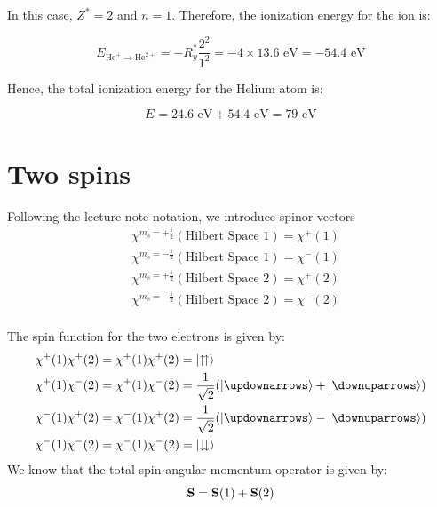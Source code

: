 \documentclass[11pt]{article}
\begin{document}
    In this case, $Z^{*} = 2$ and $n = 1$. Therefore, the ionization energy for the  ion is:

    \begin{equation}
      E_{\text{He}^{+} \rightarrow \text{He}^{2+}} = - R_y^* \frac{2^{2}}{1^{2}} = - 4 \times 13.6 \text{ eV} = - 54.4 \text{ eV}
    \end{equation}

    Hence, the total ionization energy for the Helium atom is:

    \begin{equation}
      E_{} = 24.6 \text{ eV} + 54.4 \text{ eV} = 79 \text{ eV}
    \end{equation}

    \section{Two spins}

     Following the lecture note notation, we introduce spinor vectors 
     \begin{align*}
        & \chi^{m_s = +\frac{1}{2}}(\text{Hilbert Space } 1) = \chi^+(1) \\
        & \chi^{m_s = -\frac{1}{2}}(\text{Hilbert Space } 1) = \chi^-(1) \\
        & \chi^{m_s = +\frac{1}{2}}(\text{Hilbert Space } 2) = \chi^+(2) \\
        & \chi^{m_s = -\frac{1}{2}}(\text{Hilbert Space } 2) = \chi^-(2) \\
     \end{align*}

     The spin function for the two electrons is given by:
     \begin{align*}
        \chi^+(1)\chi^+(2) & = \chi^+(1)\chi^+(2) = \ket{\upuparrows} \\
        \chi^+(1)\chi^-(2) & = \chi^+(1)\chi^-(2) = \frac{1}{\sqrt{2}}(\ket{\updownarrows} + \ket{\downuparrows}) \\
        \chi^-(1)\chi^+(2) & = \chi^-(1)\chi^+(2) = \frac{1}{\sqrt{2}}(\ket{\updownarrows} - \ket{\downuparrows}) \\
        \chi^-(1)\chi^-(2) & = \chi^-(1)\chi^-(2) = \ket{\downdownarrows} \\
     \end{align*}
     We know that the total spin angular momentum operator is given by:
      \begin{equation}
          \vb{S} = \vb{S}(1) + \vb{S}(2)
      \end{equation}
\end{document}
